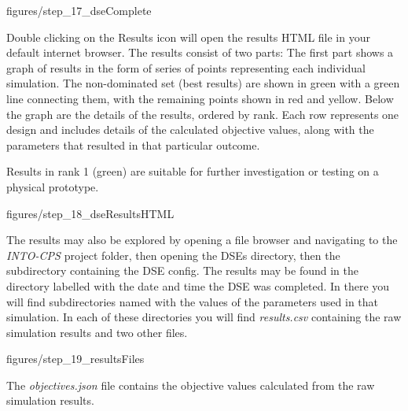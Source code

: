 \documentclass[11pt,a4paper]{../tutorial}
\begin{document}
\begin{instructions}
\begin{center}\begin{annotation}[width=0.7\linewidth,trim=0 0 0 0,clip]{figures/step_17_dseComplete}
    \end{annotation}\end{center}
\newpage
Double clicking on the Results icon will open the results HTML file in your default internet browser. The results consist of two parts:  The first part shows a graph of results in the form of series of points representing each individual simulation. The non-dominated set (best results) are shown in green with a green line connecting them, with the remaining points shown in red and yellow. Below the graph are the details of the results, ordered by rank.  Each row represents one design and includes details of the calculated objective values, along with the parameters that resulted in that particular outcome.

Results in rank 1 (green) are suitable for further investigation or testing on a physical prototype.

\begin{center}\begin{annotation}[width=0.7\linewidth,trim=0 0 0 0,clip]{figures/step_18_dseResultsHTML}
    \end{annotation}\end{center}

The results may also be explored by opening a file browser and navigating to the \emph{INTO-CPS} project folder, then opening the DSEs directory, then the subdirectory containing the DSE config. The results may be found in the directory labelled with the date and time the DSE was completed.  In there you will find subdirectories named with the values of the parameters used in that simulation.  In each of these directories you will find \emph{results.csv} containing the raw simulation results and two other files.

\begin{center}\begin{annotation}[width=0.7\linewidth,trim=0 0 0 0,clip]{figures/step_19_resultsFiles}
    \end{annotation}\end{center}
\newpage
The \emph{objectives.json} file contains the objective values calculated from the raw simulation results.


\end{instructions}
\end{document}
